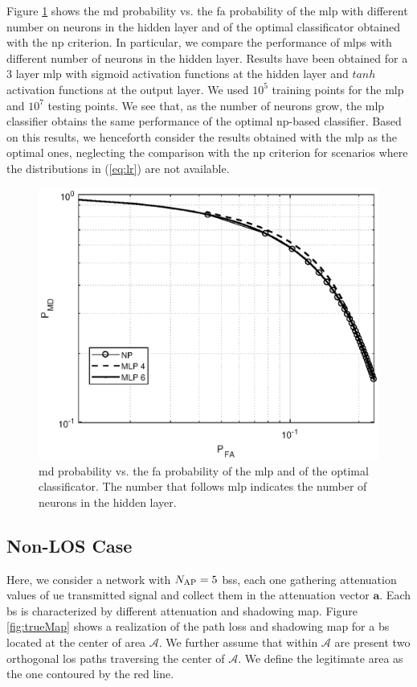 \documentclass[twocolumns]{IEEEtran}
\begin{document}
Figure \ref{fig:NP_comp} shows the \ac{md} probability vs. the \ac{fa} probability of the \ac{mlp} with different number on neurons in the hidden layer and of the optimal classificator obtained with the  \ac{np} criterion. In particular, we compare the performance of \acp{mlp} with different number of neurons in the hidden layer. Results have been obtained for a $3$ layer \ac{mlp} with sigmoid activation functions at the hidden layer and $tanh$ activation functions at the output layer. We used $10^5$ training points for the \ac{mlp} and $10^7$ testing points. We see that, as the number of neurons grow, the \ac{mlp} classifier obtains the same performance of the optimal \ac{np}-based classifier. Based on this results, we henceforth consider the results obtained with the \ac{mlp} as the optimal ones, neglecting the comparison with the \ac{np} criterion for scenarios where the distributions in (\ref{eq:lr}) are not available.

 \begin{figure}[h]
     \centering
     \includegraphics[width=1\columnwidth]{FA_MD_LOS.eps}
     \caption{\ac{md} probability vs. the \ac{fa} probability of the \ac{mlp} and of the optimal classificator. The number that follows \ac{mlp} indicates the number of neurons in the hidden layer.}
     \label{fig:NP_comp}
 \end{figure}


\subsection{Non-LOS Case}
Here, we consider a network with $N_{\rm AP}=5$ \acp{bs}, each one gathering attenuation values of \ac{ue} transmitted signal and collect them in the attenuation vector $\bm{a}$. Each \ac{bs} is characterized by different attenuation and shadowing map. Figure \ref{fig:trueMap} shows a realization of the path loss and shadowing map for a \ac{bs} located at the center of area $\mathcal{A}$. We further assume that within $\mathcal{A}$ are present two orthogonal \ac{los} paths traversing the center of $\mathcal{A}$. We define the legitimate area as the one contoured by the red line.
\end{document}
